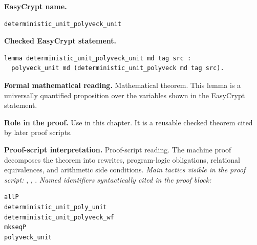 \begin{formaltheorem}
\noindent\textbf{EasyCrypt name.}
\begin{lstlisting}[language=EasyCrypt,basicstyle=\ttfamily\scriptsize]
deterministic_unit_polyveck_unit
\end{lstlisting}
\noindent\textbf{Checked EasyCrypt statement.}
\begin{lstlisting}[language=EasyCrypt,basicstyle=\ttfamily\scriptsize]
lemma deterministic_unit_polyveck_unit md tag src :
  polyveck_unit md (deterministic_unit_polyveck md tag src).
\end{lstlisting}
\noindent\textbf{Formal mathematical reading.}
Mathematical theorem. This lemma is a universally quantified proposition over the variables shown in the EasyCrypt statement.

\noindent\textbf{Role in the proof.}
Use in this chapter. It is a reusable checked theorem cited by later proof scripts.

\noindent\textbf{Proof-script interpretation.}
Proof-script reading. The machine proof decomposes the theorem into rewrites, program-logic obligations, relational equivalences, and arithmetic side conditions.
\emph{Main tactics visible in the proof script:} , , .
\emph{Named identifiers syntactically cited in the proof block:}
\begin{lstlisting}[language=EasyCrypt,basicstyle=\ttfamily\scriptsize]
allP
deterministic_unit_poly_unit
deterministic_unit_polyveck_wf
mkseqP
polyveck_unit
\end{lstlisting}

\end{formaltheorem}

